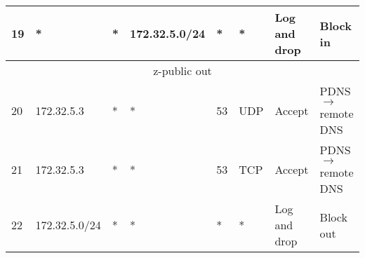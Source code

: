 \documentclass[a4paper, 11pt, oneside]{article}
\begin{document}
\begin{table}[H]
{\begin{tabular}{|llllllll|}
\multicolumn{1}{|l|}{19}          & \multicolumn{1}{l|}{*}                                                            & \multicolumn{1}{l|}{*}                                                              & \multicolumn{1}{l|}{172.32.5.0/24}                                                     & \multicolumn{1}{l|}{*}                                                                   & \multicolumn{1}{l|}{*}                 & \multicolumn{1}{l|}{Log and drop}    & Block in                               \\ \hline
\multicolumn{8}{|c|}{{\color[HTML]{FE0000} z-public out}}                                                                                                                                                                                                                                                                                                                                                                                                                                                                \\ \hline
\multicolumn{1}{|l|}{20}          & \multicolumn{1}{l|}{172.32.5.3}                                                   & \multicolumn{1}{l|}{*}                                                              & \multicolumn{1}{l|}{*}                                                                 & \multicolumn{1}{l|}{53}                                                                  & \multicolumn{1}{l|}{UDP}               & \multicolumn{1}{l|}{Accept}          & PDNS $\rightarrow$ remote DNS   \\ \hline
\multicolumn{1}{|l|}{21}          & \multicolumn{1}{l|}{172.32.5.3}                                                   & \multicolumn{1}{l|}{*}                                                              & \multicolumn{1}{l|}{*}                                                                 & \multicolumn{1}{l|}{53}                                                                  & \multicolumn{1}{l|}{TCP}               & \multicolumn{1}{l|}{Accept}          & PDNS $\rightarrow$ remote DNS   \\ \hline
\multicolumn{1}{|l|}{22}          & \multicolumn{1}{l|}{172.32.5.0/24}                                                & \multicolumn{1}{l|}{*}                                                              & \multicolumn{1}{l|}{*}                                                                 & \multicolumn{1}{l|}{*}                                                                   & \multicolumn{1}{l|}{*}                 & \multicolumn{1}{l|}{Log and drop}    & Block out                              \\ \hline

\end{tabular}}
\end{table}
\end{document}
